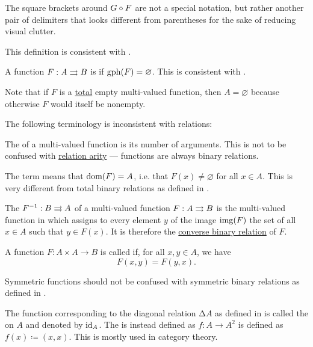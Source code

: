 \begin{definition}
\begin{thmenum}[resume=def:multi_valued_function]
    The square brackets around \( G \bincirc F \) are not a special notation, but rather another pair of delimiters that looks different from parentheses for the sake of reducing visual clutter.

    This definition is consistent with .

     A function \( F: A \rightrightarrows B \) is  if \( \operatorname{gph}(F) = \varnothing \). This is consistent with .

    Note that if \( F \) is a \hyperref[def:multi_valued_function/total]{total} empty multi-valued function, then \( A = \varnothing \) because otherwise \( F \) would itself be nonempty.
  \end{thmenum}

  The following terminology is inconsistent with relations:
  \begin{thmenum}[resume=def:multi_valued_function]
     The  of a multi-valued function is its number of arguments. This is not to be confused with \hyperref[def:relation/arity]{relation arity} --- functions are always binary relations.

     The term  means that \( \operatorname{dom}(F) = A \), i.e. that \( F(x) \neq \varnothing \) for all \( x \in A \). This is very different from total binary relations as defined in .

     The  \( F^{-1}: B \rightrightarrows A \) of a multi-valued function \( F: A \rightrightarrows B \) is the multi-valued function in which assigns to every element \( y \) of the image \( \operatorname{img}(F) \) the set of all \( x \in A \) such that \( y \in F(x) \). It is therefore the \hyperref[def:binary_relation/converse]{converse binary relation} of \( F \).

     A function \( F: A \times A \to B \) is called  if, for all \( x, y \in A \), we have
    \begin{equation*}
      F(x, y) = F(y, x).
    \end{equation*}

    Symmetric functions should not be confused with symmetric binary relations as defined in .

     The function corresponding to the diagonal relation \( \increment A \) as defined in  is called the  on \( A \) and denoted by \( \operatorname{id}_A \). The  is instead defined as \( f: A \to A^2 \) is defined as \( f(x) \coloneqq (x, x) \). This is mostly used in category theory.
  \end{thmenum}


\end{definition}
